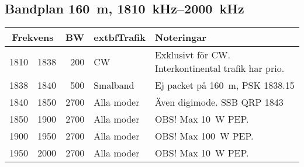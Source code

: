 \subsection{Bandplan \qty{160}{\metre}, \SIrange{1810}{2000}{\kilo\hertz}}
\begin{tabular}{rrrll}
\multicolumn{2}{c}{\textbf{Frekvens}} & \textbf{BW} & extbf{Trafik} & \textbf{Noteringar} \\ \hline

1810 & 1838 & 200  & CW         & Exklusivt för CW. Interkontinental trafik har prio. \\ \hline
1838 & 1840 & 500  & Smalband   & Ej packet på \qty{160}{\metre}, PSK \num{1838,15}         \\ \hline
1840 & 1850 & 2700 & Alla moder & Även digimode. SSB QRP \num{1843}                  \\ \hline
1850 & 1900 & 2700 & Alla moder & OBS! Max \qty{10}{\watt} PEP.                       \\ \hline
1900 & 1950 & 2700 & Alla moder & OBS! Max \qty{100}{\watt} PEP.                      \\ \hline
1950 & 2000 & 2700 & Alla moder & OBS! Max \qty{10}{\watt} PEP.                       \\
\end{tabular}

